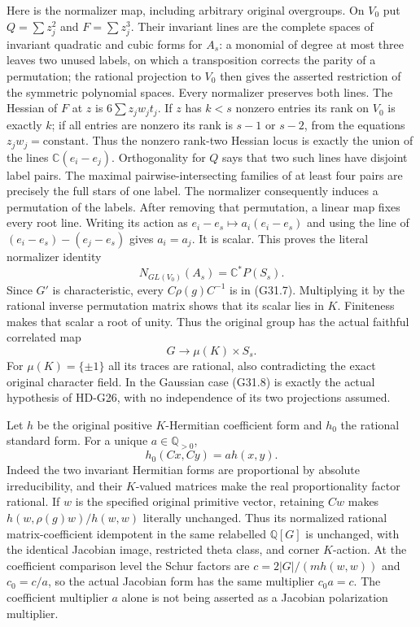 Here is the normalizer map, including arbitrary original
overgroups.  On $V_0$ put $Q=\sum z_j^2$ and $F=\sum z_j^3$.
Their invariant lines are the complete spaces of invariant
quadratic and cubic forms for $A_s$: a monomial of degree at
most three leaves two unused labels, on which a transposition
corrects the parity of a permutation; the rational projection
to $V_0$ then gives the asserted restriction of the symmetric
polynomial spaces.  Every normalizer preserves both lines.
The Hessian of $F$ at $z$ is $6\sum z_jw_jt_j$.  If $z$ has
$k<s$ nonzero entries its rank on $V_0$ is exactly $k$; if all
entries are nonzero its rank is $s-1$ or $s-2$, from the equations
$z_jw_j=\text{constant}$.  Thus the nonzero rank-two Hessian locus
is exactly the union of the lines $\mathbb C(e_i-e_j)$.
Orthogonality for $Q$ says that two such lines have disjoint
label pairs.  The maximal pairwise-intersecting families of at
least four pairs are precisely the full stars of one label.
The normalizer consequently induces a permutation of the labels.
After removing that permutation, a linear map fixes every root
line.  Writing its action as $e_i-e_s\mapsto a_i(e_i-e_s)$
and using the line of $(e_i-e_s)-(e_j-e_s)$ gives $a_i=a_j$.
It is scalar.  This proves the literal normalizer identity
\[
                  N_{GL(V_0)}(A_s)=\mathbb C^*P(S_s).
                                                               \tag{G31.7}
\]
Since $G'$ is characteristic, every $C\rho(g)C^{-1}$ is in
(G31.7).  Multiplying it by the rational inverse permutation
matrix shows that its scalar lies in $K$.  Finiteness makes
that scalar a root of unity.  Thus the original group has the
actual faithful correlated map
\[
                         G\longrightarrow\mu(K)\times S_s.
                                                               \tag{G31.8}
\]
For $\mu(K)=\{\pm1\}$ all its traces are rational, also
contradicting the exact original character field.  In the
Gaussian case (G31.8) is exactly the actual hypothesis of
HD-G26, with no independence of its two projections assumed.

Let $h$ be the original positive $K$-Hermitian coefficient form
and $h_0$ the rational standard form.  For a unique
$a\in\mathbb Q_{>0}$,
\[
                       h_0(Cx,Cy)=a h(x,y).                 \tag{G31.9}
\]
Indeed the two invariant Hermitian forms are proportional by
absolute irreducibility, and their $K$-valued matrices make
the real proportionality factor rational.  If $w$ is the
specified original primitive vector, retaining $Cw$ makes
$h(w,\rho(g)w)/h(w,w)$ literally unchanged.  Thus its normalized
rational matrix-coefficient idempotent in the same relabelled
$\mathbb Q[G]$ is unchanged, with the identical Jacobian image,
restricted theta class, and corner $K$-action.  At the coefficient
comparison level the Schur factors are
$c=2|G|/(m h(w,w))$ and $c_0=c/a$, so the actual Jacobian form
has the same multiplier $c_0a=c$.  The coefficient multiplier
$a$ alone is not being asserted as a Jacobian polarization
multiplier.

